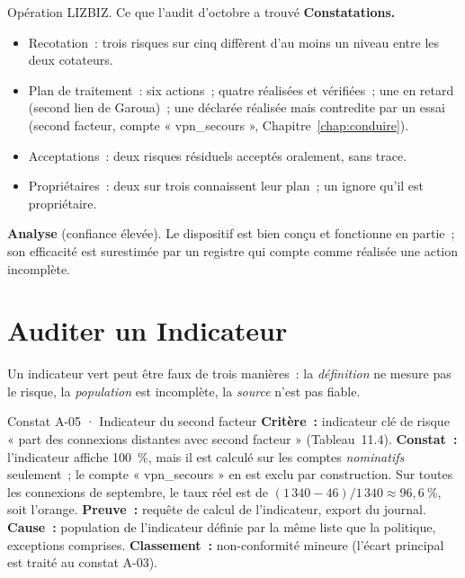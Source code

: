 \begin{boxscenario}{Opération LIZBIZ. Ce que l'audit d'octobre a trouvé}
\textbf{Constatations.}
\begin{itemize}
    \item Recotation~: trois risques sur cinq diffèrent d'au moins un
          niveau entre les deux cotateurs.
    \item Plan de traitement~: six actions~; quatre réalisées et
          vérifiées~; une en retard (second lien de Garoua)~; une déclarée
          réalisée mais contredite par un essai (second facteur, compte
          « vpn\_secours », Chapitre~\ref{chap:conduire}).
    \item Acceptations~: deux risques résiduels acceptés oralement, sans
          trace.
    \item Propriétaires~: deux sur trois connaissent leur plan~; un ignore
          qu'il est propriétaire.
\end{itemize}

\medskip
\textbf{Analyse} (confiance élevée). Le dispositif est bien conçu et
fonctionne en partie~; son efficacité est surestimée par un registre qui
compte comme réalisée une action incomplète.
\end{boxscenario}

\section{Auditer un Indicateur}
\label{sec:c14-indicateur}

Un indicateur vert peut être faux de trois manières~: la \emph{définition}
ne mesure pas le risque, la \emph{population} est incomplète, la
\emph{source} n'est pas fiable.

\begin{boxobjet}{Constat A-05 · Indicateur du second facteur}
\textbf{Critère~:} indicateur clé de risque « part des connexions
distantes avec second facteur » (Tableau~11.4). \textbf{Constat~:}
l'indicateur affiche 100~\%, mais il est calculé sur les comptes
\emph{nominatifs} seulement~; le compte « vpn\_secours » en est exclu par
construction. Sur toutes les connexions de septembre, le taux réel est de
$(1\,340 - 46) / 1\,340 \approx 96{,}6~\%$, soit l'orange.
\textbf{Preuve~:} requête de calcul de l'indicateur, export du journal.
\textbf{Cause~:} population de l'indicateur définie par la même liste que
la politique, exceptions comprises. \textbf{Classement~:} non-conformité
mineure (l'écart principal est traité au constat A-03).
\end{boxobjet}

